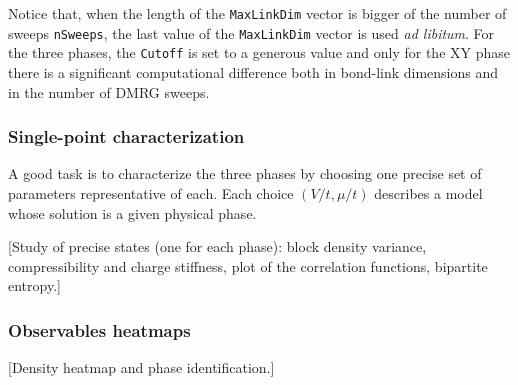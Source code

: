 \noindent Notice that, when the length of the \texttt{MaxLinkDim} vector is bigger of the number of sweeps \texttt{nSweeps}, the last value of the \texttt{MaxLinkDim} vector is used \textit{ad libitum}. For the three phases, the \texttt{Cutoff} is set to a generous value and only for the $\mathrm{XY}$ phase there is a significant computational difference both in bond-link dimensions and in the number of DMRG sweeps.

\subsubsection*{Single-point characterization}

A good task is to characterize the three phases by choosing one precise set of parameters representative of each. Each choice $(V/t,\mu/t)$ describes a model whose solution is a given physical phase.

{\color{tabred} [Study of precise states (one for each phase): block density variance, compressibility and charge stiffness, plot of the correlation functions, bipartite entropy.]}

\subsubsection*{Observables heatmaps}
{\color{tabred} [Density heatmap and phase identification.]}
